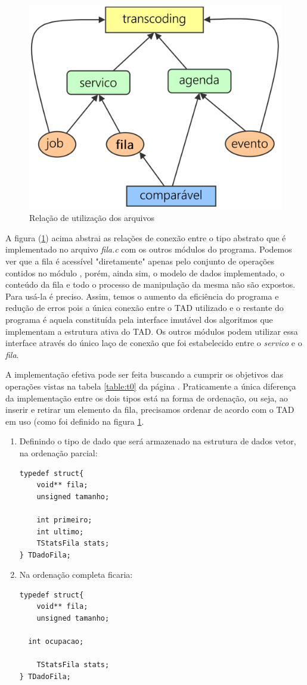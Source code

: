 \documentclass[12pt]{article}
\begin{document}
\begin{figure}[h!tb]
\centering
\includegraphics[width=.5\textwidth]{relacao_cabecalhos.png}
\caption{Relação de utilização dos arquivos}
\label{fig:cabecalhos}
\end{figure}
A figura (\ref{fig:cabecalhos}) acima abstrai as relações de conexão entre o tipo abstrato que é implementado no arquivo \emph{fila.c} com os outros módulos do programa. Podemos ver que a fila é acessível "diretamente" apenas pelo conjunto de operações contidos no módulo , porém, ainda sim, o modelo de dados implementado, o conteúdo da fila e todo o processo de manipulação da mesma não são expostos. Para usá-la é preciso. Assim, temos o aumento da eficiência do programa e redução de erros pois a única conexão entre o TAD utilizado e o restante do programa é aquela constituída pela interface imutável dos algoritmos que implementam a estrutura ativa do TAD. Os outros módulos podem utilizar essa interface através do único laço de conexão que foi estabelecido entre o \emph{servico} e o \emph{fila}.

A implementação efetiva pode ser feita buscando a cumprir os objetivos das operações vistas na tabela \ref{table:t0} da página \pageref{table:t0}. Praticamente a única diferença da implementação entre os dois tipos está na forma de ordenação, ou seja, ao inserir e retirar um elemento da fila, precisamos ordenar de acordo com o TAD em uso (como foi definido na figura \ref{fig:cabecalhos}.

\begin{enumerate}
    \item Definindo o tipo de dado que será armazenado na estrutura de dados vetor, na ordenação parcial:
\begin{lstlisting}[frame=single]
typedef struct{
	void** fila;
	unsigned tamanho;

	int primeiro;
	int ultimo;
	TStatsFila stats;
} TDadoFila;
\end{lstlisting}

    \item Na ordenação completa ficaria:
\begin{lstlisting}[frame=single]
typedef struct{
	void** fila;
	unsigned tamanho;

  int ocupacao;

	TStatsFila stats;
} TDadoFila;
\end{lstlisting}
\end{enumerate}
\end{document}
